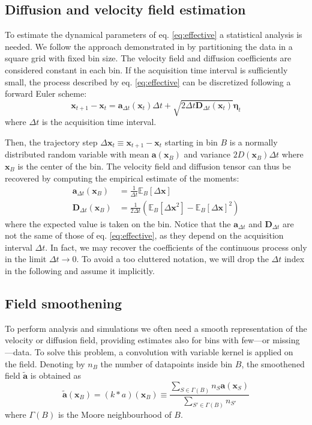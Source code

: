 \subsection{Diffusion and velocity field estimation}

To estimate the dynamical parameters of eq. \ref{eq:effective} a statistical analysis is needed. We follow the approach demonstrated in  by partitioning the data in a square grid with fixed bin size. The velocity field and diffusion coefficients are considered constant in each bin.
If the acquisition time interval is sufficiently small, the process described by eq. \ref{eq:effective} can be discretized following a forward Euler scheme:
\begin{equation}
 \bm{x}_{t+1} - \bm{x}_{t} = \bm{a}_{\Delta t}(\bm{x}_t) \Delta t + \sqrt{2\Delta t\bm{D}_{\Delta t}(\bm{x}_t)}  \bm{\eta}_t
\end{equation}
where $\Delta t$ is the acquisition time interval.

Then, the trajectory step $\Delta\bm{x}_t \equiv \bm{x}_{t+1} - \bm{x}_t$ starting in bin $B$ is a normally distributed random variable with mean $\bm{a}(\bm{x}_B)$ and variance $2D(\bm{x}_B)\Delta t$ where $\bm{x}_B$ is the center of the bin. The velocity field and diffusion tensor can thus be recovered by computing the empirical estimate of the moments:
\begin{align}
 \bm{a}_{\Delta t}(\bm{x}_B) & = \frac{1}{\Delta t} \mathbb{E}_B\left[\Delta \bm{x}\right]                                                   \\
 \bm{D}_{\Delta t}(\bm{x}_B) & = \frac{1}{2\Delta t} \left( \mathbb{E}_B\left[\Delta \bm{x}^2\right] - \mathbb{E}_B[\Delta \bm{x}]^2 \right)
\end{align}
where the expected value is taken on the bin. Notice that the $\bm{a}_{\Delta t}$ and $\bm{D}_{\Delta t}$ are not the same of those of eq. \ref{eq:effective}, as they depend on the acquisition interval $\Delta t$. In fact, we may recover the coefficients of the continuous process only in the limit $\Delta t \to 0$. To avoid a too cluttered notation, we will drop the $\Delta t$ index in the following and assume it implicitly.


\subsection{Field smoothening}\label{sec:smoothening}

To perform analysis and simulations we often need a smooth representation of the velocity or diffusion field, providing estimates also for bins with few—or missing—data. To solve this problem, a convolution with variable kernel is applied on the field. Denoting by $n_B$ the number of datapoints inside bin $B$, the smoothened field $\tilde{\bm{a}}$ is obtained as
\begin{equation} \label{eq:convolution}
 \bm{\tilde{a}}(\bm{x}_B) = (k \ast a)(\bm{x}_B) \equiv \frac{\displaystyle \sum_{S \in \Gamma(B)} n_S \bm{a}(\bm{x}_S)}{\displaystyle \sum_{S' \in \Gamma(B)} n_{S'}}
\end{equation}
where $\Gamma(B)$ is the Moore neighbourhood of $B$.

